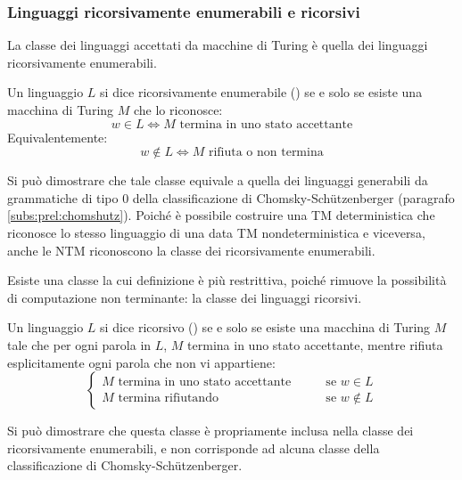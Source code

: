 \subsubsection{Linguaggi ricorsivamente enumerabili e ricorsivi}
La classe dei linguaggi accettati da macchine di Turing è quella dei linguaggi ricorsivamente enumerabili.
\begin{defin}
	Un linguaggio $L$ si dice ricorsivamente enumerabile () se e solo se esiste una macchina di Turing $M$ che lo riconosce:
	\begin{equation*}
		w\in L \iff M \text{ termina in uno stato accettante}
	\end{equation*}
	Equivalentemente:
	\begin{equation*}
		w\notin L \iff M \text{ rifiuta o non termina}
	\end{equation*}
\end{defin}
Si può dimostrare che tale classe equivale a quella dei linguaggi generabili da grammatiche di tipo 0 della classificazione di Chomsky-Schützenberger (paragrafo \ref{subs:prel:chomshutz}). Poiché è possibile costruire una TM deterministica che riconosce lo stesso linguaggio di una data TM nondeterministica e viceversa, anche le NTM riconoscono la classe dei ricorsivamente enumerabili.

Esiste una classe la cui definizione è più restrittiva, poiché rimuove la possibilità di computazione non terminante: la classe dei linguaggi ricorsivi.
\begin{defin}
	Un linguaggio $L$ si dice ricorsivo () se e solo se esiste una macchina di Turing $M$ tale che per ogni parola in $L$, $M$ termina in uno stato accettante, mentre rifiuta esplicitamente ogni parola che non vi appartiene:
	\begin{equation*}
		\begin{cases}
			\text{$M$ termina in uno stato accettante} \qquad & \text{se } w\in L    \\
			\text{$M$ termina rifiutando} \qquad              & \text{se } w\notin L
		\end{cases}
	\end{equation*}
\end{defin}
Si può dimostrare che questa classe è propriamente inclusa nella classe dei ricorsivamente enumerabili, e non corrisponde ad alcuna classe della classificazione di Chomsky-Schützenberger.



